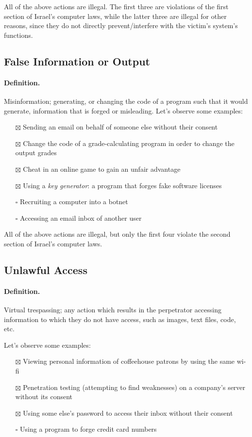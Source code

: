 All of the above actions are illegal. The first three are violations of the
first section of Israel's computer laws, while the latter three are illegal for
other reasons, since they do not directly prevent/interfere with the victim's
system's functions.

\subsection{False Information or Output}

\paragraph{Definition.} Misinformation; generating, or changing the code of a
program such that it would generate, information that is forged or misleading.
Let's observe some examples:
\begin{itemize}
    \item[$\boxtimes$] Sending an email on behalf of someone else without their
    consent
    \item[$\boxtimes$] Change the code of a grade-calculating program in order
    to change the output grades
    \item[$\boxtimes$] Cheat in an online game to gain an unfair advantage
    \item[$\boxtimes$] Using a \textit{key generator}: a program that forges
    fake software licenses
    \item[$\square$] Recruiting a computer into a botnet
    \item[$\square$] Accessing an email inbox of another user
\end{itemize}

All of the above actions are illegal, but only the first four violate the second
section of Israel's computer laws.

\subsection{Unlawful Access}

\paragraph{Definition.} Virtual trespassing; any action which results in the
perpetrator accessing information to which they do not have access, such as
images, text files, code, etc.

Let's observe some examples:
\begin{itemize}
    \item[$\boxtimes$] Viewing personal information of coffeehouse patrons by
    using the same wi-fi
    \item[$\boxtimes$] Penetration testing (attempting to find weaknesses) on a
    company's server without its consent
    \item[$\boxtimes$] Using some else's password to access their inbox without
    their consent
    \item[$\square$] Using a program to forge credit card numbers
\end{itemize}

